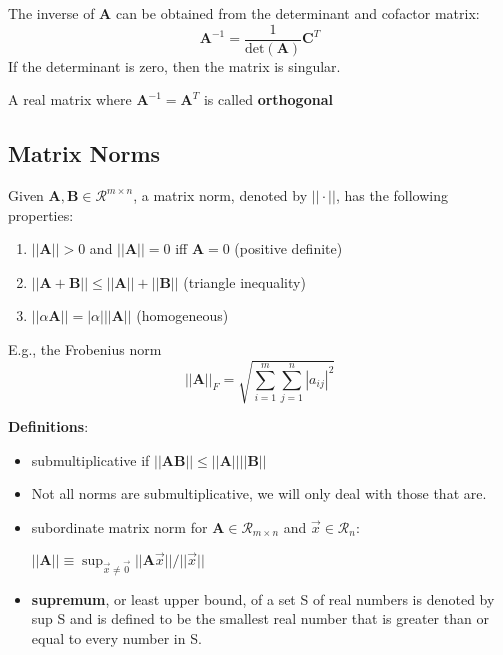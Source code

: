 \documentclass[12pt]{article}
\newcommand{\ve}[1]{\ensuremath{\mathbf{#1}}}
\begin{document}
The inverse of $\ve{A}$ can be obtained from the determinant and cofactor matrix:
%
\begin{equation}
\ve{A}^{-1} = \frac{1}{\text{det}(\ve{A})}\ve{C}^T \nonumber
\end{equation}
%
If the determinant is zero, then the matrix is singular.

A real matrix where $\ve{A}^{-1} = \ve{A}^T$ is called \textbf{orthogonal}


\subsection{Matrix Norms}
Given $\ve{A}, \ve{B} \in \mathcal{R}^{m \times n}$, a matrix norm, denoted by $|| \cdot ||$, has the following properties:
%
\begin{enumerate}
\item $||\ve{A}|| > 0$ and $||\ve{A}|| = 0$ iff $\ve{A} = 0$ (positive definite)
\item $||\ve{A} + \ve{B}|| \leq ||\ve{A}|| + ||\ve{B}||$ (triangle inequality)
\item $||\alpha \ve{A}|| = |\alpha| ||\ve{A}||$ (homogeneous)
\end{enumerate}

E.g., the Frobenius norm 
%
\begin{equation}
||\ve{A}||_F = \sqrt{ \sum_{i=1}^m \sum_{j=1}^n |a_{ij}|^2 } \nonumber
\end{equation}

\textbf{Definitions}:
\begin{itemize}
\item submultiplicative if $||\ve{A} \ve{B}|| \leq ||\ve{A}|| ||\ve{B}||$

\item Not all norms are submultiplicative, we will only deal with those that are. 

\item subordinate matrix norm for $\ve{A} \in \mathcal{R}_{m \times n}$ and $\vec{x} \in \mathcal{R}_n$:

$||\ve{A}|| \equiv \displaystyle \sup_{\vec{x} \neq \vec{0}} ||\ve{A}\vec{x}|| / ||\vec{x}||$

\item \textbf{supremum}, or least upper bound, of a set S of real numbers is denoted by sup S and is defined to be the smallest real number that is greater than or equal to every number in S.
\end{itemize}
\end{document}
